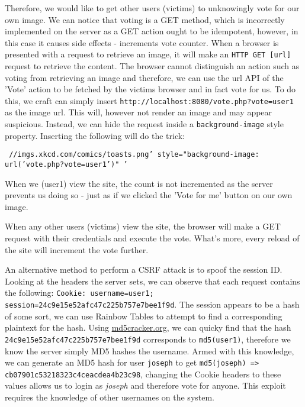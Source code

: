 \documentclass[a4paper, 12pt]{article}
\begin{document}
Therefore, we would like to get other users (victims) to unknowingly vote for our own image. We can notice that voting is a GET method, which is incorrectly implemented on the server as a GET action ought to be idempotent, however, in this case it causes side effects - increments vote counter. When a browser is presented with a request to retrieve an image, it will make an \texttt{HTTP GET [url]} request to retrieve the content. The browser cannot distinguish an action such as voting from retrieving an image and therefore, we can use the url API of the 'Vote' action to be fetched by the victims browser and in fact vote for us. To do this, we craft can simply insert \texttt{http://localhost:8080/vote.php?vote=user1} as the image url. This will, however not render an image and may appear suspicious. Instead, we can hide the request inside a \texttt{background-image} style property. Inserting the following will do the trick:

\texttt{
\newline //imgs.xkcd.com/comics/toasts.png' 
\newline style="background-image: url('vote.php?vote=user1')" '}

When we (user1) view the site, the count is not incremented as the server prevents us doing so - just as if we clicked the 'Vote for me' button on our own image.

When any other users (victims) view the site, the browser will make a GET request with their credentials and execute the vote. What's more, every reload of the site will increment the vote further.

An alternative method to perform a CSRF attack is to spoof the session ID. Looking at the headers the server sets, we can observe that each request contains the following:
\texttt{Cookie: username=user1; session=24c9e15e52afc47c225b757e7bee1f9d}. The session appears to be a hash of some sort, we can use Rainbow Tables to attempt to find a corresponding plaintext for the hash. Using \url{md5cracker.org}, we can quicky find that the hash \texttt{24c9e15e52afc47c225b757e7bee1f9d} corresponds to \texttt{md5(user1)}, therefore we know the server simply MD5 hashes the username. Armed with this knowledge, we can generate an MD5 hash for user \texttt{joseph} to get \texttt{\newline md5(joseph) => cb07901c53218323c4ceacdea4b23c98}, changing the Cookie headers to these values allows us to login as \textit{joseph} and therefore vote for anyone. This exploit requires the knowledge of other usernames on the system.
\end{document}
